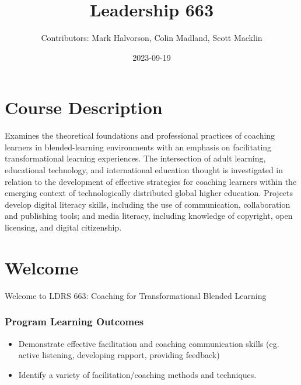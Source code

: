 \documentclass[
]{book}
\title{Leadership 663}
\author{Contributors: Mark Halvorson, Colin Madland, Scott Macklin}
\date{2023-09-19}
\providecommand{\tightlist}{%
  \setlength{\itemsep}{0pt}\setlength{\parskip}{0pt}}
\begin{document}
\maketitle

{
\setcounter{tocdepth}{1}
\tableofcontents
}
\hypertarget{course-description}{%
\chapter*{Course Description}\label{course-description}}

Examines the theoretical foundations and professional practices of coaching learners in blended-learning environments with an emphasis on facilitating transformational learning experiences. The intersection of adult learning, educational technology, and international education thought is investigated in relation to the development of effective strategies for coaching learners within the emerging context of technologically distributed global higher education. Projects develop digital literacy skills, including the use of communication, collaboration and publishing tools; and media literacy, including knowledge of copyright, open licensing, and digital citizenship.

\hypertarget{welcome}{%
\chapter*{Welcome}\label{welcome}}

Welcome to LDRS 663: Coaching for Transformational Blended Learning

\hypertarget{program-learning-outcomes}{%
\subsection*{Program Learning Outcomes}\label{program-learning-outcomes}}

\begin{itemize}
\tightlist
\item
  Demonstrate effective facilitation and coaching communication skills (eg. active listening, developing rapport, providing feedback)\\
\item
  Identify a variety of facilitation/coaching methods and techniques.
\end{itemize}
\end{document}
